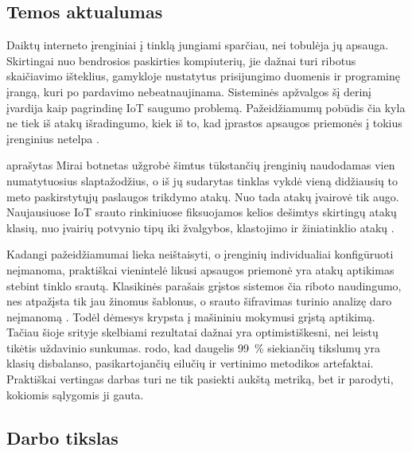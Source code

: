 
\subsection*{Temos aktualumas}

Daiktų interneto įrenginiai į tinklą jungiami sparčiau, nei tobulėja jų
apsauga. Skirtingai nuo bendrosios paskirties kompiuterių, jie dažnai
turi ribotus skaičiavimo išteklius, gamykloje nustatytus prisijungimo
duomenis ir programinę įrangą, kuri po pardavimo nebeatnaujinama.
Sisteminės apžvalgos šį derinį įvardija kaip pagrindinę IoT saugumo
problemą. Pažeidžiamumų pobūdis čia kyla ne tiek iš atakų
išradingumo, kiek iš to, kad įprastos apsaugos priemonės į tokius
įrenginius netelpa \cite{sasi2024attacks}.

\citeauthor{antonakakis2017mirai} \cite{antonakakis2017mirai} aprašytas Mirai botnetas užgrobė šimtus
tūkstančių įrenginių naudodamas vien numatytuosius slaptažodžius, o iš
jų sudarytas tinklas vykdė vieną didžiausių to meto paskirstytųjų
paslaugos trikdymo atakų. Nuo tada atakų įvairovė tik augo.
Naujausiuose IoT srauto rinkiniuose fiksuojamos kelios dešimtys skirtingų atakų
klasių, nuo įvairių potvynio tipų iki žvalgybos, klastojimo ir
žiniatinklio atakų \cite{neto2023ciciot}.

Kadangi pažeidžiamumai lieka neištaisyti, o įrenginių individualiai
konfigūruoti neįmanoma, praktiškai vienintelė likusi apsaugos
priemonė yra atakų aptikimas stebint tinklo srautą. Klasikinės
parašais grįstos sistemos čia riboto naudingumo, nes atpažįsta tik jau
žinomus šablonus, o srauto šifravimas turinio analizę daro
neįmanomą \cite{komal2026idsreview,fei2023systematic}. Todėl dėmesys
krypsta į mašininiu mokymusi grįstą aptikimą. Tačiau šioje srityje
skelbiami rezultatai dažnai yra optimistiškesni, nei leistų tikėtis
uždavinio sunkumas. \citeauthor{reddy2026datasets}
\cite{reddy2026datasets} rodo, kad daugelis 99~\% siekiančių tikslumų
yra klasių disbalanso, pasikartojančių eilučių ir vertinimo metodikos
artefaktai. Praktiškai vertingas darbas turi ne tik pasiekti aukštą
metriką, bet ir parodyti, kokiomis sąlygomis ji gauta.

\subsection*{Darbo tikslas}

